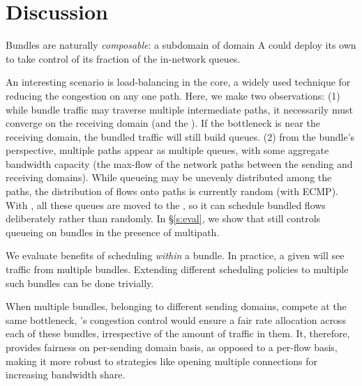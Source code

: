 \section{Discussion}\label{s:discussion}

 Bundles are naturally \emph{composable}: a subdomain of domain A could deploy its own \name to take control of its fraction of the in-network queues. 

An interesting scenario is load-balancing in the core, a widely used technique for reducing the congestion on any one path.
Here, we make two observations: 
(1) while bundle traffic may traverse multiple intermediate paths, it necessarily must converge on the receiving domain (and the \outbox). If the bottleneck is near the receiving domain, the bundled traffic will still build queues.
(2) from the bundle's perspective, multiple paths appear as multiple queues, with some aggregate bandwidth capacity (\ie the max-flow of the network paths between the sending and receiving domains). While queueing may be unevenly distributed among the paths, the distribution of flows onto paths is currently random (\eg with ECMP). With \name, all these queues are moved to the \inbox, so it can schedule bundled flows deliberately rather than randomly.
In \S\ref{s:eval}, we show that \name still controls queueing on bundles in the presence of multipath.

 We evaluate benefits of scheduling \emph{within} a bundle. In practice, a given \inbox will see traffic from multiple bundles. Extending different scheduling policies to multiple such bundles can be done trivially.

 When multiple bundles, belonging to different sending domains, compete at the same bottleneck, \name's congestion control would ensure a fair rate allocation across each of these bundles, irrespective of the amount of traffic in them. It, therefore, provides fairness on per-sending domain basis, as opposed to a per-flow basis, making it more robust to strategies like opening multiple connections for increasing bandwidth share. 



